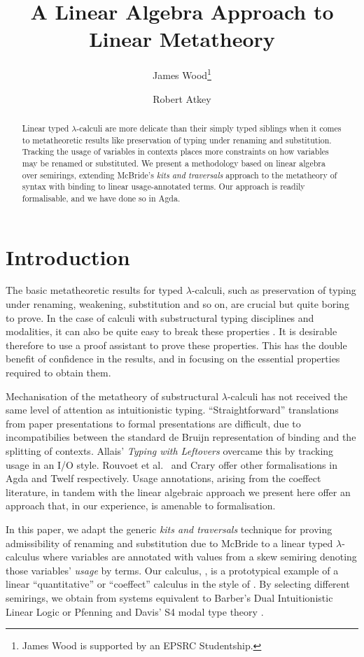 \documentclass[submission,copyright,creativecommons]{eptcs}
\title{A Linear Algebra Approach to Linear Metatheory}
\author{
James Wood\thanks{James Wood is supported by an EPSRC Studentship.}
\institute{University of Strathclyde\\ Glasgow, United Kingdom}
\email{james.wood.100@strath.ac.uk}
\and
Robert Atkey
\institute{University of Strathclyde\\ Glasgow, United Kingdom}
\email{robert.atkey@strath.ac.uk}
}
\begin{document}
\maketitle

\begin{abstract}
  Linear typed $\lambda$-calculi are more delicate than their simply
  typed siblings when it comes to metatheoretic results like
  preservation of typing under renaming and substitution. Tracking the
  usage of variables in contexts places more constraints on how
  variables may be renamed or substituted. We present a methodology
  based on linear algebra over semirings, extending McBride's
  \emph{kits and traversals} approach to the metatheory of syntax with
  binding to linear usage-annotated terms. Our approach is readily
  formalisable, and we have done so in Agda.
\end{abstract}

\section{Introduction}

The basic metatheoretic results for typed $\lambda$-calculi, such as
preservation of typing under renaming, weakening, substitution and so
on, are crucial but quite boring to prove. In the case of calculi with
substructural typing disciplines and modalities, it can also be quite
easy to break these properties \cite{wadler91use}. It is desirable
therefore to use a proof assistant to prove these properties. This has
the double benefit of confidence in the results, and in focusing on
the essential properties required to obtain them.

Mechanisation of the metatheory of substructural $\lambda$-calculi has
not received the same level of attention as intuitionistic
typing. ``Straightforward'' translations from paper presentations to
formal presentations are difficult, due to incompatibilies between the
standard de Bruijn representation of binding and the splitting of
contexts. Allais' \emph{Typing with Leftovers}
\cite{allais:LIPIcs:2018:10049} overcame this by tracking usage in an
I/O style. Rouvoet et al.~\cite{RPKV20} and Crary \cite{crary10} offer
other formalisations in Agda and Twelf respectively. Usage
annotations, arising from the coeffect literature, in tandem with the
linear algebraic approach we present here offer an approach that, in
our experience, is amenable to formalisation.

In this paper, we adapt the generic \emph{kits and traversals}
technique for proving admissibility of renaming and substitution due
to McBride \cite{rensub05} to a linear typed $\lambda$-calculus where
variables are annotated with values from a skew semiring denoting
those variables' \emph{usage} by terms. Our calculus, \name{}, is a
prototypical example of a linear ``quantitative'' or ``coeffect''
calculus in the style of
\cite{reed10distance,BrunelGMZ14,GhicaS14,PetricekOM14,Granule18}. By
selecting different semirings, we obtain from \name{} systems equivalent to
Barber's Dual Intuitionistic Linear Logic \cite{Barber1996} or
Pfenning and Davis' S4 modal type theory \cite{judgmental}.
\end{document}
